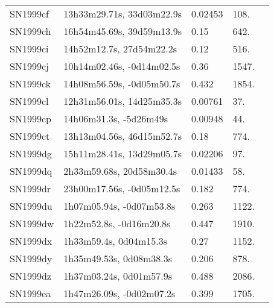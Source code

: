 \begin{longtable}{lllll}
         SN1999cf &      13h33m29.71s, 33d03m22.9s &  0.02453 &           108. &    \citet{1991RC3.9.C...0000d} \\
         SN1999ch &      16h54m45.69s, 39d59m13.9s &     0.15 &           642. &    \citet{1999IAUC.7199B...1G} \\
         SN1999ci &       14h52m12.7s, 27d54m22.2s &     0.12 &           516. &    \citet{1999IAUC.7199B...1G} \\
         SN1999cj &      10h14m02.46s, -0d14m02.5s &     0.36 &          1547. &    \citet{1999IAUC.7207C...1H} \\
         SN1999ck &      14h08m56.59s, -0d05m50.7s &    0.432 &          1854. &    \citet{1999IAUC.7207C...1H} \\
         SN1999cl &      12h31m56.01s, 14d25m35.3s &  0.00761 &            37. &    \citet{1985AJ.....90.1681B} \\
         SN1999cp &         14h06m31.3s, -5d26m49s &  0.00948 &            44. &    \citet{2004AJ....128...16K} \\
         SN1999ct &      13h13m04.56s, 46d15m52.7s &     0.18 &           774. &    \citet{2000IAUC.7356B...1G} \\
         SN1999dg &      15h11m28.41s, 13d29m05.7s &  0.02206 &            97. &    \citet{1999PASP..111..438F} \\
         SN1999dq &       2h33m59.68s, 20d58m30.4s &  0.01433 &            58. &    \citet{1993AJ....105.1271G} \\
         SN1999dr &      23h00m17.56s, -0d05m12.5s &    0.182 &           774. &    \citet{1999IAUC.7258A...1A} \\
         SN1999du &       1h07m05.94s, -0d07m53.8s &    0.263 &          1122. &    \citet{1999IAUC.7258A...1A} \\
         SN1999dw &        1h22m52.8s, -0d16m20.8s &    0.447 &          1910. &    \citet{1999IAUC.7258A...1A} \\
         SN1999dx &         1h33m59.4s, 0d04m15.3s &     0.27 &          1152. &    \citet{1999IAUC.7258A...1A} \\
         SN1999dy &        1h35m49.53s, 0d08m38.3s &    0.206 &           878. &    \citet{1999IAUC.7258A...1A} \\
         SN1999dz &        1h37m03.24s, 0d01m57.9s &    0.488 &          2086. &    \citet{1999IAUC.7258A...1A} \\
         SN1999ea &       1h47m26.09s, -0d02m07.2s &    0.399 &          1705. &    \citet{1999IAUC.7258A...1A} \\

\end{longtable}
